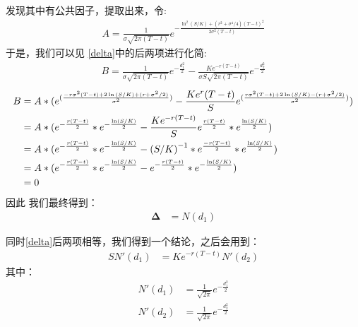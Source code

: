 \documentclass{ctexart}
\begin{document}
    \noindent 发现其中有公共因子，提取出来，令:
    \begin{align}
        A  = \frac{1}{\sigma \sqrt{2\pi (T-t)}} e^{-\frac{\ln^2(S/K)+(r^2+\sigma^4/4)(T-t)^2}{2\sigma ^2 (T-t)}}
    \end{align}
    \noindent 于是，我们可以见 \eqref{delta}中的后两项进行化简:
    \begin{align}
        B = \frac{1}{\sigma \sqrt{2\pi (T-t)}}e^{-\frac{d^2_1}{2}}-\frac{Ke^{-r(T-t)}}{\sigma S \sqrt{2\pi (T-t)}}e^{-\frac{d^2_2}{2}}
    \end{align}
    \begin{align}
        B & = A*(e^{(\frac{-r\sigma ^2 (T - t)+2\ln{(S/K)}+(r+\sigma ^2/2)}{\sigma ^2})} - \frac{Ke^r(T-t)}{S}e^{(\frac{r\sigma ^2 (T - t)+2\ln{(S/K)}-(r+\sigma ^2/2)}{\sigma ^2})})\notag \\
        & = A*(e^{-\frac{r(T-t)}{2}}*e^{-\frac{\ln(S/K)}{2}}-\frac{Ke^{-r(T-t)}}{S}e^{\frac{r(T-t)}{2}}*e^{\frac{\ln(S/K)}{2}})\notag \\
        & = A*(e^{-\frac{r(T-t)}{2}}*e^{-\frac{\ln(S/K)}{2}}-\left(S/K\right)^{-1}*e^{\frac{-r(T-t)}{2}}*e^{\frac{\ln(S/K)}{2}})\notag \\
        & = A*(e^{-\frac{r(T-t)}{2}}*e^{-\frac{\ln(S/K)}{2}}-e^{-\frac{r(T-t)}{2}}*e^{-\frac{\ln(S/K)}{2}})\notag \\
        & = 0
    \end{align}
    \noindent 因此 我们最终得到：
    \begin{align}
        \boldsymbol{\Delta} & = N(d_1)
    \end{align}
    
    \noindent 同时\eqref{delta}后两项相等，我们得到一个结论，之后会用到：
    \begin{align}
        SN'(d_1) & = Ke^{-r(T-t)}N'(d_2)\label{Equel}
    \end{align}
    其中：
    \begin{align}
        N'(d_1) & = \frac{1}{\sqrt{2\pi}}e^{-\frac{d^{2}_1}{2}}\label{N'(d1)}\\
        N'(d_2) & = \frac{1}{\sqrt{2\pi}}e^{-\frac{d^{2}_2}{2}}
    \end{align}\\

    
\end{document}
